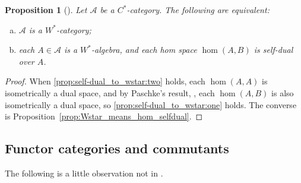 \documentclass[a4paper,11pt]{article}
\theoremstyle{plain}
\newtheorem{proposition}{Proposition}[section]
\theoremstyle{remark}
\newcommand{\mc}[1]{\mathcal{#1}}
\begin{document}
\begin{proposition}[{\cite[Proposition~2.15]{GLR_Wstar_categories}}]\label{prop:self-dual_to_wstar}
Let $\mc A$ be a $C^*$-category.  The following are equivalent:
\begin{enumerate}[(a)]
  \item\label{prop:self-dual_to_wstar:one}
  $\mc A$ is a $W^*$-category;
  \item\label{prop:self-dual_to_wstar:two}
  each $A\in\mc A$ is a $W^*$-algebra, and each hom space $\hom(A,B)$ is self-dual over $A$.
\end{enumerate}
\end{proposition}
\begin{proof}
When \ref{prop:self-dual_to_wstar:two} holds, each $\hom(A,A)$ is isometrically a dual space, and by Paschke's result, \cite[Proposition~3.8]{paschke_inner_prod_mods}, each $\hom(A,B)$ is also isometrically a dual space, so \ref{prop:self-dual_to_wstar:one} holds.  The converse is Proposition~\ref{prop:Wstar_means_hom_selfdual}.
\end{proof}


\subsection{Functor categories and commutants}

The following is a little observation not in \cite{GLR_Wstar_categories}.
\end{document}
